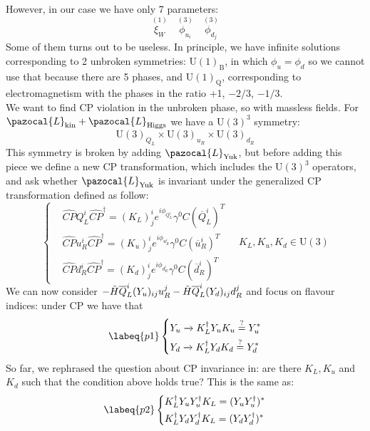 \documentclass[../main.tex]{subfiles}
\begin{document}
However, in our case we have only 7 parameters: 
\[
\overset{(1)}{\xi_W} \quad \overset{(3)}{\phi_{u_i}} \quad \overset{(3)}{\phi_{d_j}}
\]
Some of them turns out to be useless. In principle, we have infinite solutions corresponding to 2 unbroken symmetries: U$(1)_{\text{B}}$, in which $\phi_u=\phi_d$ so we cannot use that because there are 5 phases, and U$(1)_{\text{Q}}$, corresponding to electromagnetism with the phases in the ratio +1, $-2/3$, $-1/3$.\\
We want to find CP violation in the unbroken phase, so with massless fields. For $\pazocal{L}_{\text{kin}}+\pazocal{L}_{\text{Higgs}}$ we have a U$(3)^3$ symmetry: 
\[
\text{U}(3)_{Q_L}\times\text{U}(3)_{u_R}\times\text{U}(3)_{d_R}
\]
This symmetry is broken by adding $\pazocal{L}_{\text{Yuk}}$, but before adding this piece we define a new CP transformation, which includes the U$(3)^3$ operators, and ask whether $\pazocal{L}_{\text{Yuk}}$ is invariant under the generalized CP transformation defined as follow:
\[
\left\{
\begin{aligned}
&\hat{CP}Q_L^i\hat{CP}^\dagger=(K_L)^i_je^{i\phi_{Q_L^i}}\gamma^0C(\overline{Q}_L^i)^T\\
&\hat{CP}u_R^i\hat{CP}^\dagger=(K_u)^i_je^{i\phi_{u_R^i}}\gamma^0C(\overline{u}_R^i)^T\\
&\hat{CP}d_R^i\hat{CP}^\dagger=(K_d)^i_je^{i\phi_{d_R^i}}\gamma^0C(\overline{d}_R^i)^T
\end{aligned}
\right.
\quad 
K_L,K_u,K_d\in\text{U}(3)
\]
We can now consider $-\Tilde{H}\overline{Q}_L^i(Y_u)_{ij}u_R^j-\Tilde{H}\overline{Q}_L^i(Y_d)_{ij}d_R^j$ and focus on flavour indices: under CP we have that
\begin{equation}
\labeq{p1}
\left\{
\begin{aligned}
&Y_u\xrightarrow[]{}K_L^\dagger Y_uK_u\stackrel{?}{=}Y_u^*\\
&Y_d\xrightarrow[]{}K_L^\dagger Y_dK_d\stackrel{?}{=}Y_d^*
\end{aligned}
\right.
\end{equation}
So far, we rephrased the question about CP invariance in: are there $K_L,K_u$ and $K_d$ such that the condition above holds true? This is the same as:
\begin{equation}
\labeq{p2}
\left\{
\begin{aligned}
&K_L^\dagger Y_uY_u^\dagger K_L=(Y_uY_u^\dagger)^*\\
&K_L^\dagger Y_dY_d^\dagger K_L=(Y_dY_d^\dagger)^*
\end{aligned}
\right.
\end{equation}
\end{document}
